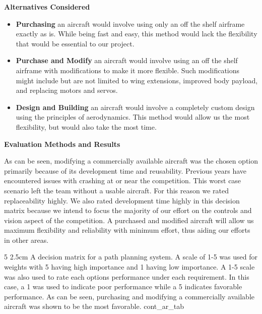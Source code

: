 \textbf{Alternatives Considered}
\begin{itemize}
\item \textbf{Purchasing} an aircraft would involve using only an off the shelf airframe exactly as is. While being fast and easy, this method would lack the flexibility that would be essential to our project.
\item \textbf{Purchase and Modify} an aircraft would involve using an off the shelf airframe with modifications to make it more flexible. Such modifications might include but are not limited to wing extensions, improved body payload, and replacing motors and servos.
\item \textbf{Design and Building} an aircraft would involve a completely custom design using the principles of aerodynamics.  This method would allow us the most flexibility, but would also take the most time.
\end{itemize}

\textbf{Evaluation Methods and Results}

As can be seen, modifying a commercially available aircraft was the chosen option primarily because of its development time and reusability. Previous years have encountered issues with crashing at or near the competition. This worst case scenario left the team without a usable aircraft. For this reason we rated replaceability highly. We also rated development time highly in this decision matrix because we intend to focus the majority of our effort on the controls and vision aspect of the competition. A purchased and modified aircraft will allow us maximum flexibility and reliability with minimum effort, thus aiding our efforts in other areas.

\begin{AUVSITable}
{5}
{2.5cm}
{A decision matrix for a path planning system. A scale of 1-5 was used for weights with 5 having high importance and 1 having low importance. A 1-5 scale was also used to rate each options performance under each requirement. In this case, a 1 was used to indicate poor performance while a 5 indicates favorable performance. As can be seen, purchasing and modifying a commercially available aircraft was shown to be the most favorable.}
{cont_ar_tab}


\end{AUVSITable}


